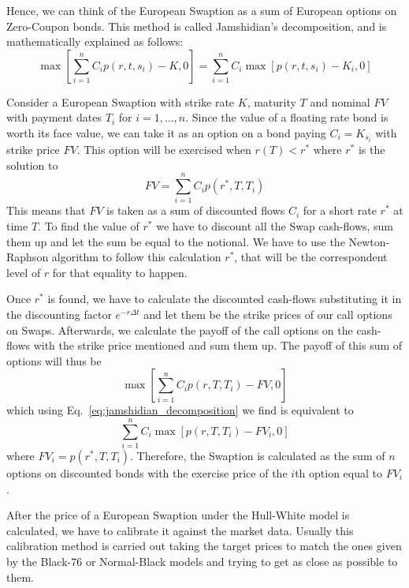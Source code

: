 \documentclass[12pt,a4paper]{book}
\begin{document}
Hence, we can think of the European Swaption as a sum of European
options on Zero-Coupon bonds. This method is called Jamshidian’s decomposition, and is mathematically explained as follows:
\begin{equation}
	\max\left[\sum_{i=1}^n C_i p(r, t, s_i) - K, 0\right] = \sum_{i=1}^n C_i \max\left[p(r, t, s_i) - K_i, 0\right]
	\label{eq:jamshidian_decomposition}
\end{equation}

Consider a European Swaption with strike rate $K$, maturity $T$ and nominal $FV$
with payment dates $T_i$ for $i = 1,\ldots, n$. Since the value of a floating rate bond is worth its face value, we can take it as an option on a bond paying $C_i = K_{s_i}$ with strike price $FV$. This option will be exercised when $r(T) < r^*$ where $r^*$ is the solution to
\begin{equation}
	FV = \sum_{i=1}^n C_i p(r^*, T, T_i)
\end{equation}
This means that $FV$ is taken as a sum of discounted flows $C_i$ for a short rate $r^*$ at time $T$. To find the value of $r^*$ we have to discount all the Swap cash-flows, sum them up and let the sum be equal to the notional. We have to use the Newton-Raphson algorithm to follow this calculation $r^*$, that will be the correspondent level of $r$ for that equality to happen. 

Once $r^*$ is found, we have to calculate the discounted cash-flows substituting it in the discounting factor $e^{-r\Delta t}$ and let them be the strike prices of our call options on Swaps.
Afterwards, we calculate the payoff of the call options on the cash-flows with
the strike price mentioned and sum them up. The payoff of this sum of options
will thus be
\begin{equation}
	\max\left[\sum_{i=1}^n C_ip(r, T, T_i)-FV, 0\right]
\end{equation}
which using Eq.~\ref{eq:jamshidian_decomposition} we find is equivalent to
\begin{equation}
	\sum_{i=1}^n C_i \max\left[p(r, T, T_i)-FV_i, 0\right]
\end{equation}
where $FV_i = p(r^*, T, T_i)$. 
Therefore, the Swaption is calculated as the sum of $n$ options on discounted bonds with the exercise price of the $i$th option equal to $FV_i$.

After the price of a European Swaption under the Hull-White model is calculated, we have to calibrate it against the market data. Usually this calibration method is carried out taking the target prices to match the ones given by the Black-76 or Normal-Black models and trying to get as close as possible to them.
\end{document}
